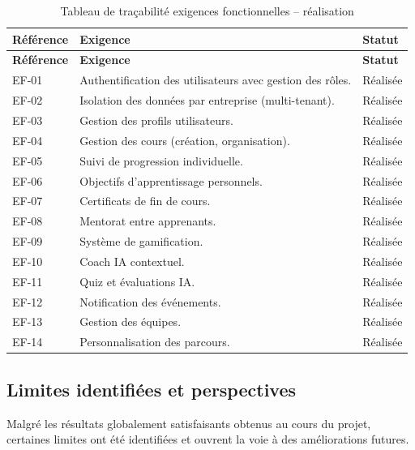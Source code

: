 \begin{longtable}{|p{3cm}|p{6.5cm}|p{4cm}|}
    \caption{Tableau de traçabilité exigences fonctionnelles -- réalisation}
    \label{tab:ch3_traceability} \\
    \hline
    \textbf{Référence} & \textbf{Exigence} & \textbf{Statut} \\
    \hline
    \endfirsthead
    \hline
    \textbf{Référence} & \textbf{Exigence} & \textbf{Statut} \\
    \hline
    \endhead
    \hline
    \endfoot
    EF-01 & Authentification des utilisateurs avec gestion des rôles. & Réalisée \\
    \hline
    EF-02 & Isolation des données par entreprise (multi-tenant). & Réalisée \\
    \hline
    EF-03 & Gestion des profils utilisateurs. & Réalisée \\
    \hline
    EF-04 & Gestion des cours (création, organisation). & Réalisée \\
    \hline
    EF-05 & Suivi de progression individuelle. & Réalisée \\
    \hline
    EF-06 & Objectifs d'apprentissage personnels. & Réalisée \\
    \hline
    EF-07 & Certificats de fin de cours. & Réalisée \\
    \hline
    EF-08 & Mentorat entre apprenants. & Réalisée \\
    \hline
    EF-09 & Système de gamification. & Réalisée \\
    \hline
    EF-10 & Coach IA contextuel. & Réalisée \\
    \hline
    EF-11 & Quiz et évaluations IA. & Réalisée \\
    \hline
    EF-12 & Notification des événements. & Réalisée \\
    \hline
    EF-13 & Gestion des équipes. & Réalisée \\
    \hline
    EF-14 & Personnalisation des parcours. & Réalisée \\
    \hline
\end{longtable}

\subsection{Limites identifiées et perspectives}

Malgré les résultats globalement satisfaisants obtenus au cours du projet, certaines limites ont été identifiées et ouvrent la voie à des améliorations futures.

